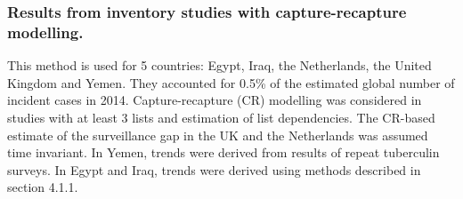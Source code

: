 \subsubsection {Results from inventory studies with capture-recapture modelling\cite{WHO2012}.} This method is used for 5 countries: Egypt\cite{20487611}, Iraq\cite{23485379}, the Netherlands\cite{17156496}, the United Kingdom\cite{Anderson2010} and Yemen\cite{23485378}. They accounted for 0.5\% of the estimated global number of incident cases in 2014. Capture-recapture (CR) modelling was considered in studies with at least 3 lists and estimation of list dependencies\cite{WHO2012}. The CR-based estimate of the surveillance gap in the UK and the Netherlands was assumed time invariant. In Yemen, trends were derived from results of repeat tuberculin surveys\cite{19723398}. In Egypt and Iraq, trends were derived using methods described in section 4.1.1.

